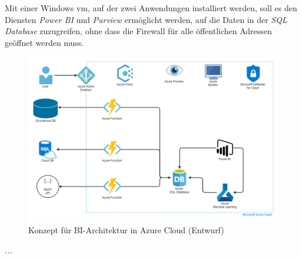 Mit einer Windows \ac{vm}, auf der zwei Anwendungen installiert werden, soll es den Diensten \textit{Power BI} und \textit{Purview} ermöglicht werden, auf die Daten in der \textit{SQL Database} zuzugreifen, ohne dass die Firewall für alle öffentlichen Adressen geöffnet werden muss. 













\begin{figure}[htbp]
 \centering
 \includegraphics[width=\textwidth]{gfx/chap03_konzept_architektur.png}
 \caption{Konzept für BI-Architektur in Azure Cloud (Entwurf)}
\label{fig:chap03_4_konzeptArchitektur}
\end{figure}

\textit{...}